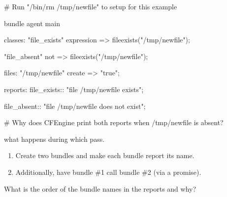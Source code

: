 \begin{codelisting}
\begin{code}
# Run "/bin/rm /tmp/newfile" to setup for this example

bundle agent main
{
  classes:
      "file_exists"
        expression => fileexists("/tmp/newfile");

      "file_absent"
        not => fileexists("/tmp/newfile");

  files:
      "/tmp/newfile"
        create => "true";

  reports:
    file_exists::
      "file /tmp/newfile exists";

    file_absent::
      "file /tmp/newfile does not exist";
}

# Why does CFEngine print both reports when /tmp/newfile is absent?
\end{code}
\end{codelisting}





\begin{aside}
\label{aside:exercise_21}

what happens during which pass.

\end{aside}





\begin{aside}
\label{aside:exercise_22}

\begin{enumerate}
\item{} Create two bundles and make each bundle report its name.
\item{} Additionally, have bundle \#1 call bundle \#2 (via a 
promise).
\end{enumerate}

What is the order of the bundle names in the reports and why?

\end{aside}